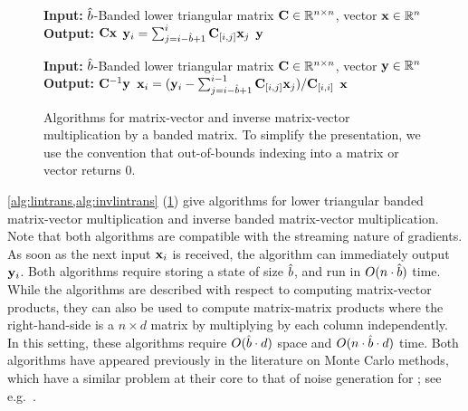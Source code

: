 \documentclass{article}
\begin{document}
\begin{figure}[!t]
\begin{minipage}{0.46\textwidth}
\begin{algorithm}[H]
\caption{Banded Matrix Multiplication} \label{alg:lintrans}
\begin{algorithmic}%
\State \textbf{Input:} $\hat{b}$-Banded lower triangular matrix $\mathbf{C} \in \mathbb{R}^{n \times n}$, vector $\mathbf{x} \in \mathbb{R}^n$
\State \textbf{Output:} $\mathbf{C} \mathbf{x}$
\State $\mathbf{y}_i = \sum_{j=i-\hat{b}+1}^i \mathbf{C}_{[i,j]} \mathbf{x}_j $
\EndFor
\Return $\mathbf{y}$
\end{algorithmic}
\end{algorithm}
\end{minipage}
\hfill
\begin{minipage}{0.46\textwidth}
\begin{algorithm}[H]
\caption{Banded Inverse Multiplication} \label{alg:invlintrans}
\begin{algorithmic}%
\State \textbf{Input:} $\hat{b}$-Banded lower triangular matrix $\mathbf{C} \in \mathbb{R}^{n \times n}$, vector $\mathbf{y} \in \mathbb{R}^n$
\State \textbf{Output:} $\mathbf{C}^{-1} \mathbf{y}$
\State $\mathbf{x}_i = 
(\mathbf{y}_i - \sum_{j=i-\hat{b}+1}^{i-1} \mathbf{C}_{[i,j]} \mathbf{x}_j) / \mathbf{C}_{[i,i]} $
\EndFor
\Return $\mathbf{x}$
\end{algorithmic}
\end{algorithm}
\end{minipage}
\caption{\label{fig:bandedlinops} Algorithms for matrix-vector and inverse matrix-vector multiplication by a banded matrix.  To simplify the presentation, we use the convention that out-of-bounds indexing into a matrix or vector returns $0$.}
\end{figure}

\cref{alg:lintrans,alg:invlintrans} (\cref{fig:bandedlinops}) give algorithms for lower triangular banded matrix-vector multiplication and inverse banded matrix-vector multiplication.  Note that both algorithms are compatible with the streaming nature of gradients.  As soon as the next input $\mathbf{x}_i$ is received, the algorithm can immediately output $\mathbf{y}_i$.  Both algorithms require storing a state of size $\hat{b}$, and run in $O(n \cdot \hat{b})$ time.  While the algorithms are described with respect to computing matrix-vector products, they can also be used to compute matrix-matrix products where the right-hand-side is a $n \times d$ matrix by multiplying by each column independently.  In this setting, these algorithms require $O(\hat{b} \cdot d)$ space and $O(n \cdot \hat{b} \cdot d)$ time. Both algorithms have appeared previously in the literature on Monte Carlo methods, which have a similar problem at their core to that of noise generation for \MF; see e.g.~\citep[Section 2]{vono2021highdimensional}.
\end{document}
